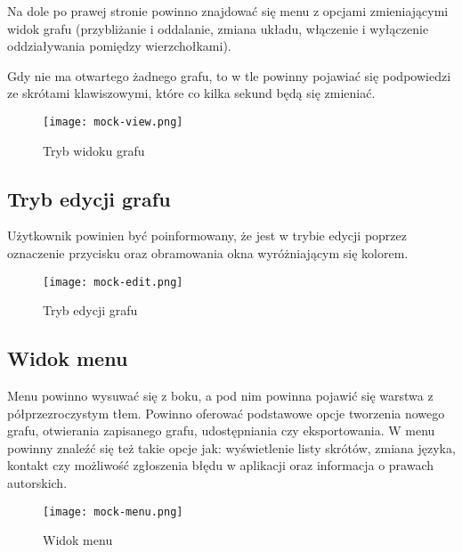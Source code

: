 Na dole po prawej stronie powinno znajdować się menu z opcjami zmieniającymi widok grafu (przybliżanie i oddalanie, zmiana układu, włączenie i wyłączenie oddziaływania pomiędzy wierzchołkami).

Gdy nie ma otwartego żadnego grafu, to w tle powinny pojawiać się podpowiedzi ze skrótami klawiszowymi, które co kilka sekund będą się zmieniać. 

\vspace*{\fill}
\begin{figure}[H]
\centering
\texttt{[image: mock-view.png]}
\caption{Tryb widoku grafu}
\end{figure}
\vspace*{\fill}

\pagebreak

\subsection*{Tryb edycji grafu}

Użytkownik powinien być poinformowany, że jest w trybie edycji poprzez oznaczenie przycisku oraz obramowania okna wyróżniającym się kolorem.

\vspace*{\fill}
\begin{figure}[H]
\centering
\texttt{[image: mock-edit.png]}
\caption{Tryb edycji grafu}
\end{figure}
\vspace*{\fill}

\pagebreak

\subsection*{Widok menu}

Menu powinno wysuwać się z boku, a pod nim powinna pojawić się warstwa z półprzezroczystym tłem. Powinno oferować podstawowe opcje tworzenia nowego grafu, otwierania zapisanego grafu, udostępniania czy eksportowania. W menu powinny znaleźć się też takie opcje jak: wyświetlenie listy skrótów, zmiana języka, kontakt czy możliwość zgłoszenia błędu w aplikacji oraz informacja o prawach autorskich.

\vspace*{\fill}
\begin{figure}[H]
\centering
\texttt{[image: mock-menu.png]}
\caption{Widok menu}
\end{figure}
\vspace*{\fill}

